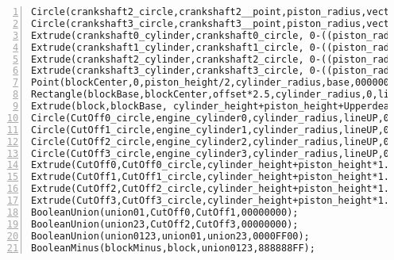 \begin{lstlisting}[numbers=left]
Circle(crankshaft2_circle,crankshaft2__point,piston_radius,vectorLeft,0000FF00);
Circle(crankshaft3_circle,crankshaft3__point,piston_radius,vectorLeft,0000FF00);
Extrude(crankshaft0_cylinder,crankshaft0_circle, 0-((piston_radius+circle)*2),00FFFFFF);
Extrude(crankshaft1_cylinder,crankshaft1_circle, 0-((piston_radius+circle)*2),00FFFFFF);
Extrude(crankshaft2_cylinder,crankshaft2_circle, 0-((piston_radius+circle)*2),00FFFFFF);
Extrude(crankshaft3_cylinder,crankshaft3_circle, 0-((piston_radius+circle)*2),00FFFFFF);
Point(blockCenter,0,piston_height/2,cylinder_radius,base,00000000);
Rectangle(blockBase,blockCenter,offset*2.5,cylinder_radius,0,lineUP,00000000);
Extrude(block,blockBase, cylinder_height+piston_height+Upperdeadcenterpiston_height*2,FFFFFF00);
Circle(CutOff0_circle,engine_cylinder0,cylinder_radius,lineUP,00000000);
Circle(CutOff1_circle,engine_cylinder1,cylinder_radius,lineUP,00000000);
Circle(CutOff2_circle,engine_cylinder2,cylinder_radius,lineUP,00000000);
Circle(CutOff3_circle,engine_cylinder3,cylinder_radius,lineUP,00000000);
Extrude(CutOff0,CutOff0_circle,cylinder_height+piston_height*1.5+Upperdeadcenterpiston_height,00000000);
Extrude(CutOff1,CutOff1_circle,cylinder_height+piston_height*1.5+Upperdeadcenterpiston_height,00000000);
Extrude(CutOff2,CutOff2_circle,cylinder_height+piston_height*1.5+Upperdeadcenterpiston_height,00000000);
Extrude(CutOff3,CutOff3_circle,cylinder_height+piston_height*1.5+Upperdeadcenterpiston_height,00000000);
BooleanUnion(union01,CutOff0,CutOff1,00000000);
BooleanUnion(union23,CutOff2,CutOff3,00000000);
BooleanUnion(union0123,union01,union23,0000FF00);
BooleanMinus(blockMinus,block,union0123,888888FF);
\end{lstlisting}